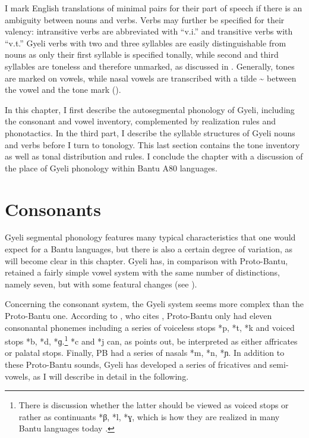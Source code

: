 I mark English translations of minimal pairs for their part of speech if there is an ambiguity between nouns and verbs. Verbs may further be specified for their valency: intransitive verbs are abbreviated with ``v.i.'' and transitive verbs with ``v.t.''   Gyeli verbs with two and three syllables are easily distinguishable from nouns as only their first syllable is specified tonally, while second and third syllables are toneless and therefore unmarked, as discussed in . Generally, tones are marked on vowels, while nasal vowels are transcribed with a tilde {\textlangle}\textasciitilde{\textrangle} between the vowel and the tone mark ().

In this chapter, I first describe the autosegmental phonology of Gyeli, including the consonant and vowel inventory, complemented by realization rules and  phonotactics. In the third part, I describe the syllable structures of Gyeli nouns and verbs before I turn to tonology. This last section contains the tone inventory as well as tonal distribution and rules. I conclude the chapter with a discussion of the place of Gyeli phonology within Bantu A80 languages.



\section{Consonants}
\label{sec:Consonants}

Gyeli segmental phonology features many typical characteristics that one would expect for a Bantu languages, but there is also a certain degree of variation, as will become clear in this chapter. Gyeli has, in comparison with Proto-Bantu, retained a fairly simple vowel system with the same number of distinctions, namely seven, but with some featural changes (see ).

Concerning the consonant system, the Gyeli system seems more complex than the Proto-Bantu one. According to \citet[42]{hyman2003}, who cites \citet{meeussen67}, Proto-Bantu only had eleven consonantal phonemes including a series of voiceless stops *p, *t, *k and voiced stops *b, *d, *ɡ.\footnote{There is discussion whether the latter should be viewed as voiced stops or rather as continuants *β, *l, *ɣ, which is how they are realized in many Bantu languages today \citep[42]{hyman2003}.} *c and *j  can, as \citet{hyman2003} points out, be interpreted as either affricates or palatal stops. Finally, PB had a series of nasals *m, *n, *ɲ. In addition to these Proto-Bantu sounds, Gyeli has developed a series of fricatives and semi-vowels, as I will describe in detail in the following.


